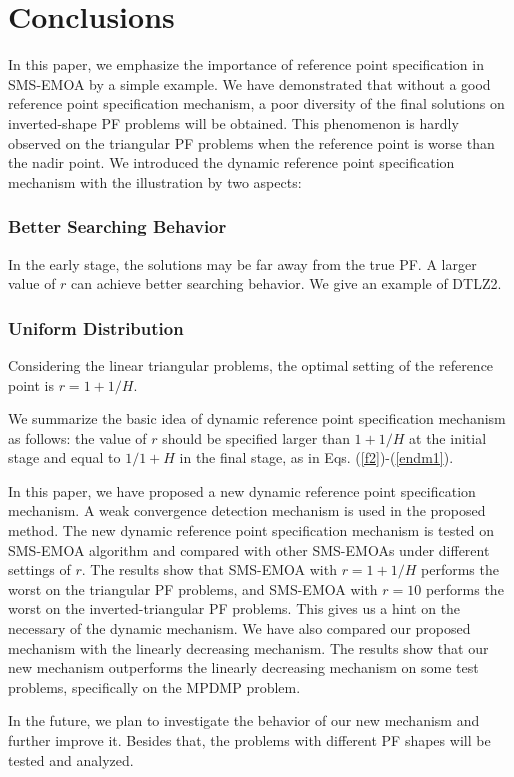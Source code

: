 \documentclass[conference]{IEEEtran}
\begin{document}
\section{Conclusions}

In this paper, we emphasize the importance of reference point specification 
in SMS-EMOA by a simple example. 
We have demonstrated that without a good reference point specification mechanism, 
a poor diversity of the final solutions on inverted-shape PF problems will be obtained. 
This phenomenon is hardly observed on the triangular PF problems when the reference point is worse than the nadir point. 
We introduced the dynamic reference point specification mechanism with the illustration by two aspects: 
\subsubsection{Better Searching Behavior} In the early stage, 
the solutions may be far away from the true PF. 
A larger value of $r$ can achieve better searching behavior.  
We give an example of DTLZ2. 
\subsubsection{Uniform Distribution} Considering the linear triangular problems, 
the optimal setting of the reference point is $r=1+1/H$. 

We summarize the basic idea of dynamic reference point specification mechanism as follows: 
the value of $r$ should be specified larger than $1+1/H$ at the initial stage 
and equal to $1/1+H$ in the final stage, as in Eqs. (\ref{f2})-(\ref{endm1}). 

In this paper, we have proposed a new dynamic reference point specification mechanism. 
A weak convergence detection mechanism is used in the proposed method. 
The new dynamic reference point specification mechanism is tested on SMS-EMOA algorithm 
and compared with other SMS-EMOAs under different settings of $r$. 
The results show that SMS-EMOA with $r=1+1/H$ performs the worst on the triangular PF problems, 
and SMS-EMOA with $r=10$ performs the worst on the inverted-triangular PF problems. 
This gives us a hint on the necessary of the dynamic mechanism. 
We have also compared our proposed mechanism with the linearly decreasing mechanism. 
The results show that our new mechanism outperforms the linearly decreasing mechanism on some test problems, 
specifically on the MPDMP problem. 

In the future, we plan to investigate the behavior of our new mechanism and further improve it. 
Besides that, the problems with different PF shapes will be tested and analyzed. 

 
 
\end{document}
